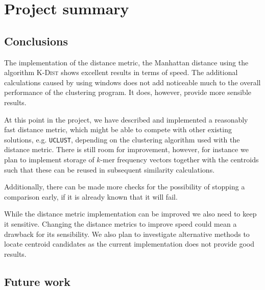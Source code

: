\section{Project summary}

\subsection{Conclusions}
\label{sec:conclusions}

The implementation of the distance metric, the Manhattan distance using the
algorithm \textsc{K-Dist} shows excellent results in terms of speed. The
additional calculations caused by using windows does not add noticeable much
to the overall performance of the clustering program. It does, however,
provide more sensible results.

At this point in the project, we have described and implemented a reasonably
fast distance metric, which might be able to compete with other existing
solutions, e.g. \texttt{UCLUST}, depending on the clustering algorithm used
with the distance metric. There is still room for improvement, however, for
instance we plan to implement storage of $k$-mer frequency vectors together
with the centroids such that these can be reused in subsequent similarity
calculations.

Additionally, there can be made more checks for the possibility of stopping a
comparison early, if it is already known that it will fail.

While the distance metric implementation can be improved we also need to keep
it sensitive. Changing the distance metrics to improve speed could mean a
drawback for its sensibility. We also plan to investigate alternative methods
to locate centroid candidates as the current implementation does not provide
good results.

\subsection{Future work}
\label{sec:future_work}



